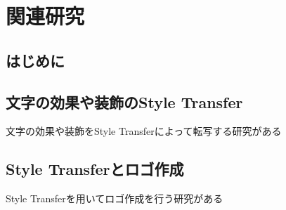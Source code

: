\documentclass[\homedir/main.tex]{subfiles}
\begin{document}
\setcounter{chapter}{1}
\chapter{関連研究}\label{sec:relatedworks}
\section{はじめに}

\section{文字の効果や装飾のStyle Transfer}
文字の効果や装飾をStyle Transferによって転写する研究がある
\cite{typography2019}

\section{Style Transferとロゴ作成}
Style Transferを用いてロゴ作成を行う研究がある
\end{document}
